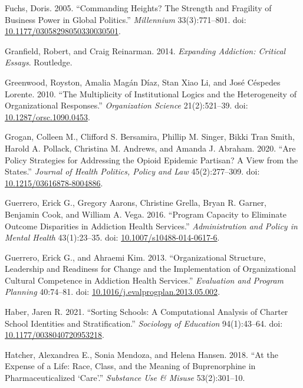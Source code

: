\documentclass[
  12pt,
]{article}
\begin{document}
\leavevmode\hypertarget{ref-fuchs2005}{}%
Fuchs, Doris. 2005. ``Commanding Heights? The Strength and Fragility of Business Power in Global Politics.'' \emph{Millennium} 33(3):771--801. doi: \href{https://doi.org/10.1177/03058298050330030501}{10.1177/03058298050330030501}.

\leavevmode\hypertarget{ref-granfield2014}{}%
Granfield, Robert, and Craig Reinarman. 2014. \emph{Expanding Addiction: Critical Essays}. Routledge.

\leavevmode\hypertarget{ref-greenwood2010}{}%
Greenwood, Royston, Amalia Magán Díaz, Stan Xiao Li, and José Céspedes Lorente. 2010. ``The Multiplicity of Institutional Logics and the Heterogeneity of Organizational Responses.'' \emph{Organization Science} 21(2):521--39. doi: \href{https://doi.org/10.1287/orsc.1090.0453}{10.1287/orsc.1090.0453}.

\leavevmode\hypertarget{ref-grogan2020}{}%
Grogan, Colleen M., Clifford S. Bersamira, Phillip M. Singer, Bikki Tran Smith, Harold A. Pollack, Christina M. Andrews, and Amanda J. Abraham. 2020. ``Are Policy Strategies for Addressing the Opioid Epidemic Partisan? A View from the States.'' \emph{Journal of Health Politics, Policy and Law} 45(2):277--309. doi: \href{https://doi.org/10.1215/03616878-8004886}{10.1215/03616878-8004886}.

\leavevmode\hypertarget{ref-guerrero2016}{}%
Guerrero, Erick G., Gregory Aarons, Christine Grella, Bryan R. Garner, Benjamin Cook, and William A. Vega. 2016. ``Program Capacity to Eliminate Outcome Disparities in Addiction Health Services.'' \emph{Administration and Policy in Mental Health} 43(1):23--35. doi: \href{https://doi.org/10.1007/s10488-014-0617-6}{10.1007/s10488-014-0617-6}.

\leavevmode\hypertarget{ref-guerrero2013}{}%
Guerrero, Erick G., and Ahraemi Kim. 2013. ``Organizational Structure, Leadership and Readiness for Change and the Implementation of Organizational Cultural Competence in Addiction Health Services.'' \emph{Evaluation and Program Planning} 40:74--81. doi: \href{https://doi.org/10.1016/j.evalprogplan.2013.05.002}{10.1016/j.evalprogplan.2013.05.002}.

\leavevmode\hypertarget{ref-haber2021}{}%
Haber, Jaren R. 2021. ``Sorting Schools: A Computational Analysis of Charter School Identities and Stratification.'' \emph{Sociology of Education} 94(1):43--64. doi: \href{https://doi.org/10.1177/0038040720953218}{10.1177/0038040720953218}.

\leavevmode\hypertarget{ref-hatcher2018}{}%
Hatcher, Alexandrea E., Sonia Mendoza, and Helena Hansen. 2018. ``At the Expense of a Life: Race, Class, and the Meaning of Buprenorphine in Pharmaceuticalized `Care'.'' \emph{Substance Use \& Misuse} 53(2):301--10.
\end{document}
